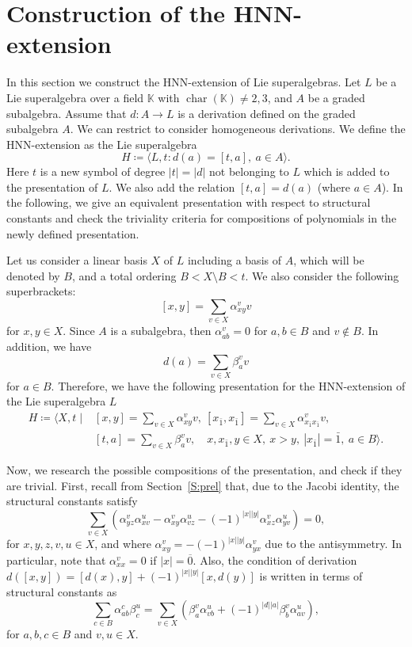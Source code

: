 \documentclass[reqno]{amsart}
\theoremstyle{definition}
\theoremstyle{remark}
\numberwithin{equation}{section}
\DeclareMathOperator{\chr}{char}
\begin{document}
\section{Construction of the HNN-extension} \label{S:HNN}
In this section we construct the  HNN-extension of Lie superalgebras. Let $L$ be a Lie superalgebra over a field $\mathbb{K}$ with $\chr(\mathbb{K})\neq 2,3$, and $A$ be a graded subalgebra. Assume that $d\colon A\to L$ is a derivation defined on the graded subalgebra $A$. We can restrict to consider homogeneous derivations. We define the HNN-extension as the Lie superalgebra
\[
H \coloneqq \langle L, t: d(a)=[t,a], \ a\in A \rangle.
\]
Here $t$ is a new symbol of degree $|t|=|d|$ not belonging to $L$ which is added to the presentation of $L$. We also add the relation $[t,a]=d(a)$ (where $a\in A$). In the following, we give an equivalent presentation with respect to structural constants and check the triviality criteria for compositions of polynomials in the newly defined presentation.

Let us consider a linear basis $X$ of $L$ including a basis of $A$, which will be denoted by $B$, and a total ordering $ B < X\setminus B< t$.
We also consider the following superbrackets:
\[[x,y]=\sum_{v\in X} \alpha_{xy}^{v} v\]
for $x,y \in X$. Since $A$ is a subalgebra, then $\alpha_{ab}^v=0$ for $a,b \in B$ and $v \notin B$. In addition, we have
\[ d(a)= \sum_{v\in X} \beta_{a}^{v} v \]
for $a \in B$. Therefore, we have the following presentation for the HNN-extension of the Lie superalgebra $L$
\begin{align*}
    H \coloneqq \langle X,t \mid &[x,y]=\sum_{v\in X} \alpha_{xy}^{v} v, ~ [x_{\bar{1}},x_{\bar{1}}]=\sum_{v\in X} \alpha_{x_{\bar{1}}x_{\bar{1}}}^v v,\\
    & [t,a]=\sum_{v\in X} \beta_{a}^{v} v,\quad  x,x_{\bar{1}},y \in X, ~ x>y ,~ |x_{\bar{1}}|=\bar{1}, ~ a \in B \rangle.
\end{align*}

Now, we research the possible compositions of the presentation, and check if they are trivial. First, recall from Section~\ref{S:prel} that, due to the Jacobi identity, the structural constants satisfy
\begin{equation}\label{jac}
\sum_{v\in X}(\alpha_{yz}^v\alpha_{xv}^{u}-\alpha_{xy}^v\alpha_{vz}^{u}-(-1)^{|x||y|}\alpha_{xz}^v\alpha_{yv}^{u})=0,
\end{equation}
for $x,y,z,v,u\in X$, and where $\alpha_{xy}^v=-(-1)^{|x||y|}\alpha_{yx}^{v}$ due to the antisymmetry. In particular, note that $\alpha_{xx}^v=0$ if $|x|=\overline{0}$.
Also, the condition of derivation $d([x,y])=[d(x),y]+(-1)^{|x||y|}[x,d(y)]$ is written in terms of structural constants as
\begin{equation}\label{der}
\sum_{c\in B}\alpha_{ab}^c\beta_c^{u}=\sum_{v\in X}(\beta_a^v\alpha_{vb}^{u}+(-1)^{|d||a|}\beta_b^v\alpha_{av}^{u}),
\end{equation}
for $a,b,c\in B$ and $v,u\in X$.
\end{document}
